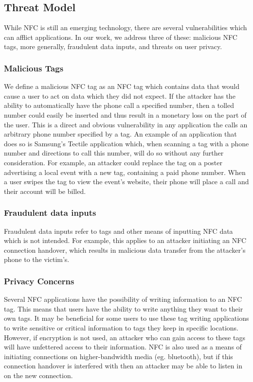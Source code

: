 \documentclass[12pt]{article}
\begin{document}
\subsection{Threat Model}
While NFC is still an emerging technology, there are several vulnerabilities which can afflict applications.
In our work, we address three of these: malicious NFC tags, more generally, fraudulent data inputs, and threats on user privacy.
\subsubsection{Malicious Tags}
We define a malicious NFC tag as an NFC tag which contains data that would cause a user to act on data which they did not expect.
If the attacker has the ability to automatically have the phone call a specified number, then a tolled number could easily be inserted and thus result in a monetary loss on the part of the user. 
This is a direct and obvious vulnerability in any application the calls an arbitrary phone number specified by a tag.
An example of an application that does so is Samsung's Tectile application which, when scanning a tag with a phone number and directions to call this number, will do so without any further consideration. 
For example, an attacker could replace the tag on a poster advertising a local event with a new tag, containing a paid phone number.
When a user swipes the tag to view the event's website, their phone will place a call and their account will be billed.
\subsubsection{Fraudulent data inputs}
Fraudulent data inputs refer to tags and other means of inputting NFC data which is not intended.
For example, this applies to an attacker initiating an NFC connection handover, which results in malicious data transfer from the attacker's phone to the victim's.

\subsubsection{Privacy Concerns}
Several NFC applications have the possibility of writing information to an NFC tag.
This means that users have the ability to write anything they want to their own tags.
It may be beneficial for some users to use these tag writing applications to write sensitive or critical information to tags they keep in specific locations.
However, if encryption is not used, an attacker who can gain access to these tags will have unfettered access to their information.
NFC is also used as a means of initiating connections on higher-bandwidth media (eg. bluetooth), but if this connection handover is interfered with then an attacker may be able to listen in on the new connection.
\end{document}
